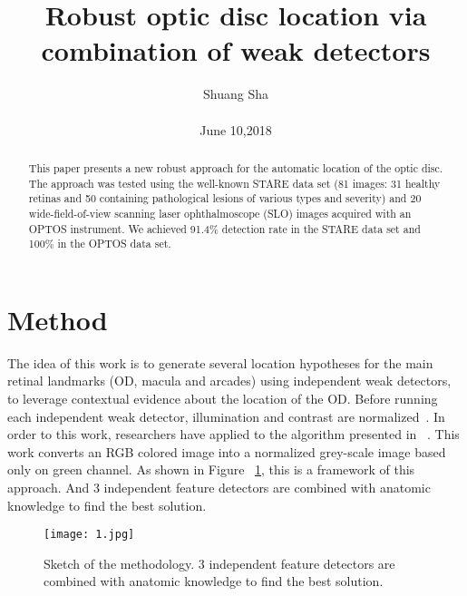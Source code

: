 \documentclass[10pt,twocolumn,letterpaper]{article}
\begin{document}
\title{Robust optic disc location via combination of weak detectors}

\author{Shuang Sha \\\\ June 10,2018}

\maketitle

\begin{abstract}
  This paper presents a new robust approach for the automatic location of the optic disc. The approach was tested using the well-known STARE data set (81 images: 31 healthy retinas and 50 containing pathological lesions of various types and severity) and 20 wide-field-of-view scanning laser ophthalmoscope (SLO) images acquired with an OPTOS instrument. We achieved 91.4\% detection rate in the STARE data set and 100\% in the OPTOS data set.
\end{abstract}

\section{Method}

The idea of this work is to generate several location hypotheses for the main retinal landmarks (OD, macula and arcades) using independent weak detectors, to leverage contextual evidence about the location of the OD.
Before running each independent weak detector, illumination and contrast are normalized~\cite{Perez2008Robust}. In order to this work, researchers have applied to the algorithm presented in ~\cite{foracchia2005luminosity}. This work converts an RGB colored image into a normalized grey-scale image based only on green channel. As shown in Figure ~\ref{fig:onecol}, this is a framework of this approach. And 3 independent feature detectors are combined with anatomic knowledge to find the best solution.

\begin{figure}[!htpb]
\begin{center}
   \texttt{[image: 1.jpg]}
\end{center}
   \caption{Sketch of the methodology. 3 independent feature detectors are combined with anatomic knowledge to find the best solution.}
\label{fig:onecol}
\end{figure}
\end{document}
